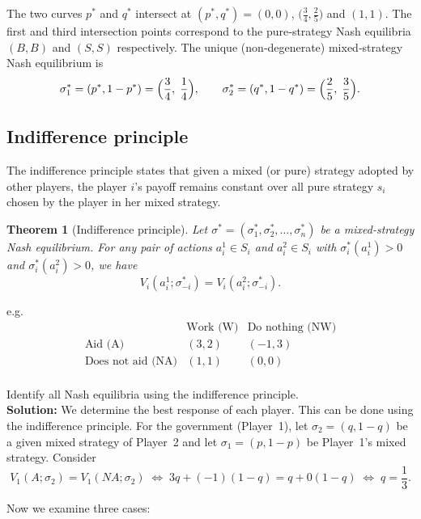\documentclass[twoside]{article}
\theoremstyle{definitionstyle}
\newtheorem*{theorem}{Theorem}
\begin{document}
\bigskip
\noindent
The two curves \(p^*\) and \(q^*\) intersect at \((p^*, q^*) = (0,0)\), \(\bigl(\frac{3}{4}, \frac{2}{5}\bigr)\) and \((1,1)\). The first and third intersection points correspond to the pure‑strategy Nash equilibria \((B,B)\) and \((S,S)\) respectively. The unique (non‑degenerate) mixed‑strategy Nash equilibrium is
\[
\sigma_1^* = (p^*, 1-p^*) = \Bigl(\frac{3}{4},\; \frac{1}{4}\Bigr), \qquad
\sigma_2^* = (q^*, 1-q^*) = \Bigl(\frac{2}{5},\; \frac{3}{5}\Bigr).
\]
%
%
%
%
%
\subsection{Indifference principle}
The indifference principle states that given a mixed (or pure) strategy adopted by other players, the player $i$'s payoff remains constant over all pure strategy $s_i$ chosen by the player in her mixed strategy. 
\begin{theorem}[Indifference principle]
   Let \(\sigma^* = (\sigma_1^*, \sigma_2^*, \dots, \sigma_n^*)\) be a mixed-strategy Nash equilibrium. For any pair of actions \(a_{i}^1 \in S_i\) and \(a_{i}^2 \in S_i\) with \(\sigma_i^*(a_{i}^1) > 0\) and \(\sigma_i^*(a_{i}^2) > 0\), we have
\[
V_i(a_{i}^1; \sigma_{-i}^*) = V_i(a_{i}^2; \sigma_{-i}^*).
\]
\end{theorem}
e.g.\noindent
\[
\begin{array}{c|cc}
& \text{Work (W)} & \text{Do nothing (NW)} \\
\hline
\text{Aid (A)} & (3,2) & (-1,3) \\
\text{Does not aid (NA)} & (1,1) & (0,0) \\
\end{array}
\]

\noindent
Identify all Nash equilibria using the indifference principle.\\
\textbf{Solution:}
We determine the best response of each player. This can be done using the indifference principle.
For the government (Player~1), let \(\sigma_2 = (q, 1-q)\) be a given mixed strategy of Player~2 and let \(\sigma_1 = (p, 1-p)\) be Player~1’s mixed strategy. Consider
\[
V_1(A; \sigma_2) = V_1(NA; \sigma_2)
\;\Longleftrightarrow\;
3q + (-1)(1-q) = q + 0(1-q)
\;\Longleftrightarrow\;
q = \frac{1}{3}.
\]

Now we examine three cases:
\end{document}
